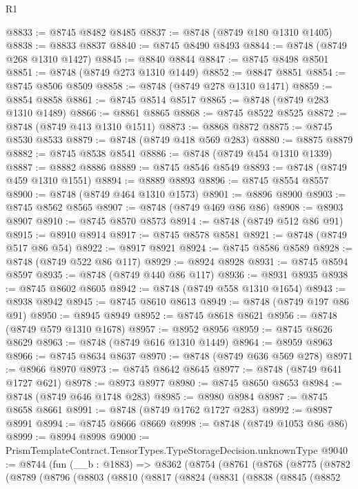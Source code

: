 \begin{lexlean}{R1}
\begin{coremodule}
@8833 := @8745 @8482 @8485
@8837 := @8748 (@8749 @180 @1310 @1405)
@8838 := @8833 @8837
@8840 := @8745 @8490 @8493
@8844 := @8748 (@8749 @268 @1310 @1427)
@8845 := @8840 @8844
@8847 := @8745 @8498 @8501
@8851 := @8748 (@8749 @273 @1310 @1449)
@8852 := @8847 @8851
@8854 := @8745 @8506 @8509
@8858 := @8748 (@8749 @278 @1310 @1471)
@8859 := @8854 @8858
@8861 := @8745 @8514 @8517
@8865 := @8748 (@8749 @283 @1310 @1489)
@8866 := @8861 @8865
@8868 := @8745 @8522 @8525
@8872 := @8748 (@8749 @413 @1310 @1511)
@8873 := @8868 @8872
@8875 := @8745 @8530 @8533
@8879 := @8748 (@8749 @418 @569 @283)
@8880 := @8875 @8879
@8882 := @8745 @8538 @8541
@8886 := @8748 (@8749 @454 @1310 @1339)
@8887 := @8882 @8886
@8889 := @8745 @8546 @8549
@8893 := @8748 (@8749 @459 @1310 @1551)
@8894 := @8889 @8893
@8896 := @8745 @8554 @8557
@8900 := @8748 (@8749 @464 @1310 @1573)
@8901 := @8896 @8900
@8903 := @8745 @8562 @8565
@8907 := @8748 (@8749 @469 @86 @86)
@8908 := @8903 @8907
@8910 := @8745 @8570 @8573
@8914 := @8748 (@8749 @512 @86 @91)
@8915 := @8910 @8914
@8917 := @8745 @8578 @8581
@8921 := @8748 (@8749 @517 @86 @54)
@8922 := @8917 @8921
@8924 := @8745 @8586 @8589
@8928 := @8748 (@8749 @522 @86 @117)
@8929 := @8924 @8928
@8931 := @8745 @8594 @8597
@8935 := @8748 (@8749 @440 @86 @117)
@8936 := @8931 @8935
@8938 := @8745 @8602 @8605
@8942 := @8748 (@8749 @558 @1310 @1654)
@8943 := @8938 @8942
@8945 := @8745 @8610 @8613
@8949 := @8748 (@8749 @197 @86 @91)
@8950 := @8945 @8949
@8952 := @8745 @8618 @8621
@8956 := @8748 (@8749 @579 @1310 @1678)
@8957 := @8952 @8956
@8959 := @8745 @8626 @8629
@8963 := @8748 (@8749 @616 @1310 @1449)
@8964 := @8959 @8963
@8966 := @8745 @8634 @8637
@8970 := @8748 (@8749 @636 @569 @278)
@8971 := @8966 @8970
@8973 := @8745 @8642 @8645
@8977 := @8748 (@8749 @641 @1727 @621)
@8978 := @8973 @8977
@8980 := @8745 @8650 @8653
@8984 := @8748 (@8749 @646 @1748 @283)
@8985 := @8980 @8984
@8987 := @8745 @8658 @8661
@8991 := @8748 (@8749 @1762 @1727 @283)
@8992 := @8987 @8991
@8994 := @8745 @8666 @8669
@8998 := @8748 (@8749 @1053 @86 @86)
@8999 := @8994 @8998
@9000 := PrismTemplateContract.TensorTypes.TypeStorageDecision.unknownType
@9040 := @8744
    (fun (__b : @1883) =>
    @8362
      (@8754
        (@8761
          (@8768
            (@8775
              (@8782
                (@8789
                  (@8796
                    (@8803
                      (@8810
                        (@8817
                          (@8824
                            (@8831
                              (@8838
                                (@8845
                                  (@8852

\end{coremodule}
\end{lexlean}
